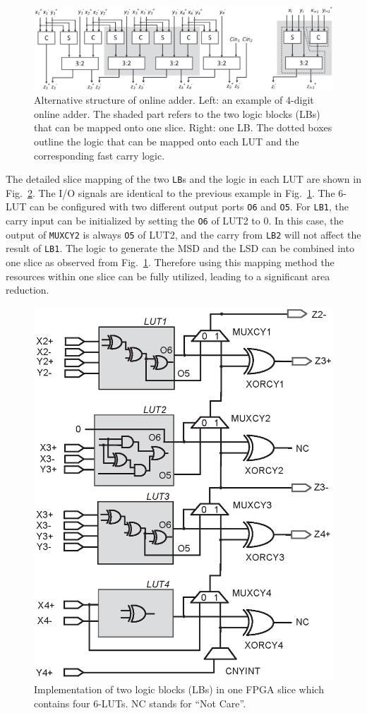 \documentclass[conference]{IEEEtran}
\begin{document}

\begin{figure}[tbp]
	\centering
	\includegraphics[width=.85\textwidth]{./Figures/SDadder_FPGA_New_4digit.eps}
	\vspace{-3ex}
	\caption{Alternative structure of online adder. Left: an example of 4-digit online adder. The shaded part refers to the two logic blocks (LBs) that can be mapped onto one slice. Right: one LB. The dotted boxes outline the logic that can be mapped onto each LUT and the corresponding fast carry logic.}
	\vspace{-2ex}	
	\label{Fig:ModifiedOA}
\end{figure}

The detailed slice mapping of the two \texttt{LB}s and the logic in each LUT are shown in Fig.~\ref{Fig:SliceNew}. The I/O signals are identical to the previous example in Fig.~\ref{Fig:ModifiedOA}. The 6-LUT can be configured with two different output ports \texttt{O6} and \texttt{O5}. For \texttt{LB1}, the carry input can be initialized by setting the \texttt{O6} of LUT2 to 0. In this case, the output of \texttt{MUXCY2} is always \texttt{O5} of LUT2, and the carry from \texttt{LB2} will not affect the result of \texttt{LB1}. The logic to generate the MSD and the LSD can be combined into one slice as observed from Fig.~\ref{Fig:ModifiedOA}. Therefore using this mapping method the resources within one slice can be fully utilized, leading to a significant area reduction.\vspace{-0.5ex}

\begin{figure}[tbp]
	\centering
	\includegraphics[width=.49\textwidth]{./Figures/SDadder_FastCarry_New.eps}
	\vspace{-5ex}
	\caption{Implementation of two logic blocks (LBs) in one FPGA slice which contains four 6-LUTs. NC stands for ``Not Care''.}
	\vspace{-2ex}	
	\label{Fig:SliceNew}
\end{figure}
\end{document}
